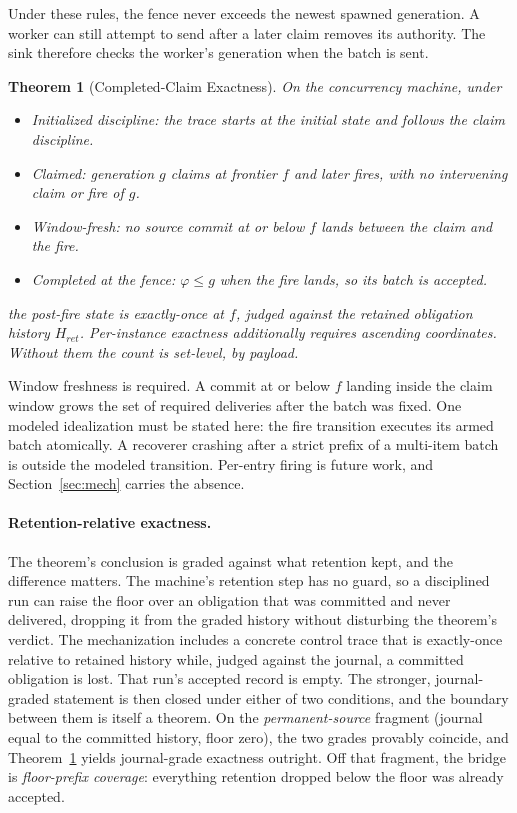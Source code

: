 \documentclass[sigplan,10pt]{acmart}
\theoremstyle{plain}
\newtheorem{theorem}{Theorem}
\theoremstyle{definition}
\begin{document}
Under these rules, the fence never exceeds the newest spawned generation.
A worker can still attempt to send after a later claim removes its
authority. The sink therefore checks the worker's generation when the
batch is sent.

\begin{theorem}[Completed-Claim Exactness]\label{thm:claim}
On the concurrency machine, under
\begin{itemize}
\item[C1.] \emph{Initialized discipline:} the trace starts at the
  initial state and follows the claim discipline.
\item[C2.] \emph{Claimed:} generation $g$ claims at frontier $f$ and
  later fires, with no intervening claim or fire of $g$.
\item[C3.] \emph{Window-fresh:} no source commit at or below $f$ lands
  between the claim and the fire.
\item[C4.] \emph{Completed at the fence:} $\varphi \le g$ when the
  fire lands, so its batch is accepted.
\end{itemize}
the post-fire state is exactly-once at $f$, judged against the
retained obligation history $H_{\mathit{ret}}$. Per-instance exactness
additionally requires ascending coordinates. Without them the count is
set-level, by payload.
\end{theorem}

Window freshness is required. A commit at or below
$f$ landing inside the claim window grows the set of required deliveries after the batch
was fixed. One modeled idealization must be stated here: the fire
transition executes its armed batch atomically. A recoverer crashing after a strict prefix of a
multi-item batch is outside the modeled transition. Per-entry firing is
future work, and Section~\ref{sec:mech} carries the absence.

\paragraph{Retention-relative exactness.}
The theorem's conclusion is graded against what retention kept, and
the difference matters. The machine's retention step has no guard, so
a disciplined run can raise the floor over
an obligation that was committed and never delivered, dropping it from
the graded history without disturbing the theorem's verdict. The
mechanization includes a concrete control trace that is exactly-once
relative to retained history while, judged against the journal,
a committed obligation is lost. That run's accepted record is empty. The
stronger, journal-graded statement is then closed under either of two
conditions, and the boundary between them is itself a theorem. On the
\emph{permanent-source} fragment (journal equal to the committed
history, floor zero), the two grades provably coincide, and
Theorem~\ref{thm:claim} yields journal-grade exactness outright. Off
that fragment, the bridge is \emph{floor-prefix coverage}: everything
retention dropped below the floor was already accepted.
\end{document}
